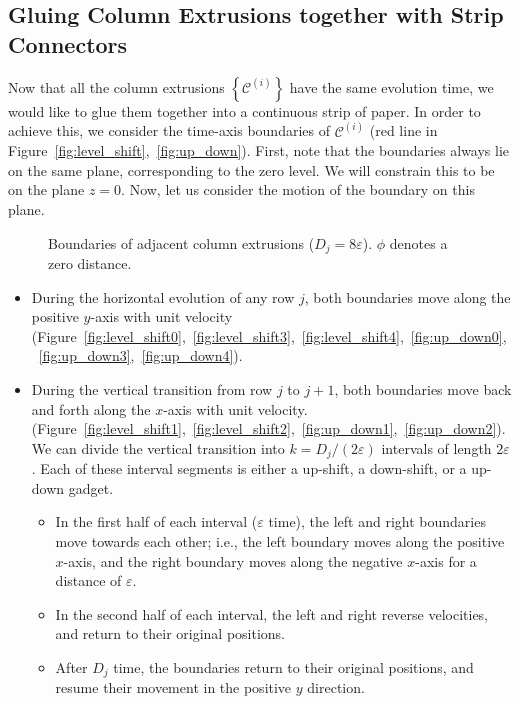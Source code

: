 \subsection{Gluing Column Extrusions together with Strip Connectors}
\label{sec:strip_connectors}
Now that all the column extrusions $\left\{ \mathcal C^{(i)} \right\}$ have the same evolution time,
we would like to glue them together into a continuous strip of paper.
In order to achieve this, we consider the time-axis boundaries of $\mathcal C^{(i)}$ (red line in Figure~\ref{fig:level_shift},~\ref{fig:up_down}).
First, note that the boundaries always lie on the same plane, corresponding to the zero level.
We will constrain this to be on the plane $z=0$. Now, let us consider the motion of the boundary on this plane.

\graphicspath{{./figures/}}
\begin{wrapfigure}[16]{r}{0.27\textwidth}
    \vspace{-2.8em}
    \def\svgwidth{0.27\textwidth}
    \caption{Boundaries of adjacent column extrusions ($D_j = 8\varepsilon$). $\phi$ denotes a zero distance.}
    \label{fig:boundaries}
\end{wrapfigure}
\begin{itemize}
    \item During the horizontal evolution of any row $j$, both boundaries move along the positive $y$-axis with unit velocity
          (Figure~\ref{fig:level_shift0},~\ref{fig:level_shift3},~\ref{fig:level_shift4},~\ref{fig:up_down0},~\ref{fig:up_down3},~\ref{fig:up_down4}).
    \item During the vertical transition from row $j$ to $j+1$, both boundaries move back and forth along the $x$-axis with unit velocity.
          (Figure~\ref{fig:level_shift1},~\ref{fig:level_shift2},~\ref{fig:up_down1},~\ref{fig:up_down2}).
          We can divide the vertical transition into $k = D_j/(2\varepsilon)$ intervals of length $2\varepsilon$.
          Each of these interval segments is either a up-shift, a down-shift, or a up-down gadget.
    \begin{itemize}
        \item In the first half of each interval ($\varepsilon$ time), the left and right boundaries move towards each other;
              i.e., the left boundary moves along the positive $x$-axis,
              and the right boundary moves along the negative $x$-axis for a distance of $\varepsilon$.
        \item In the second half of each interval, the left and right reverse velocities, and return to their original positions.
        \item After $D_j$ time, the boundaries return to their original positions, and resume their movement in the positive $y$ direction.
    \end{itemize}
\end{itemize}

